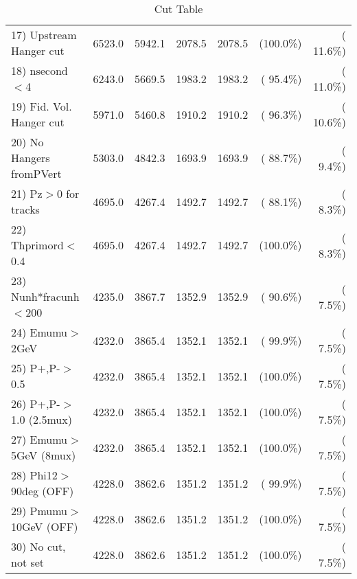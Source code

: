 \begin{table}[h!]
\begin{tabular}{||l||r|r|r|r|r|r||}
 17) Upstream Hanger cut  &       6523.0 &       5942.1 &       2078.5 &       2078.5 & (100.0\%) & ( 11.6\%) \\
 18) nsecond$<$4          &       6243.0 &       5669.5 &       1983.2 &       1983.2 & ( 95.4\%) & ( 11.0\%) \\
 19) Fid. Vol. Hanger cut &       5971.0 &       5460.8 &       1910.2 &       1910.2 & ( 96.3\%) & ( 10.6\%) \\
 20) No Hangers fromPVert &       5303.0 &       4842.3 &       1693.9 &       1693.9 & ( 88.7\%) & (  9.4\%) \\
 21) Pz$>$0 for tracks    &       4695.0 &       4267.4 &       1492.7 &       1492.7 & ( 88.1\%) & (  8.3\%) \\
 22) Thprimord$<$0.4      &       4695.0 &       4267.4 &       1492.7 &       1492.7 & (100.0\%) & (  8.3\%) \\
 23) Nunh*fracunh$<$200   &       4235.0 &       3867.7 &       1352.9 &       1352.9 & ( 90.6\%) & (  7.5\%) \\
 24) Emumu$>$2GeV         &       4232.0 &       3865.4 &       1352.1 &       1352.1 & ( 99.9\%) & (  7.5\%) \\
 25) P+,P-$>$0.5          &       4232.0 &       3865.4 &       1352.1 &       1352.1 & (100.0\%) & (  7.5\%) \\
 26) P+,P-$>$1.0 (2.5mux) &       4232.0 &       3865.4 &       1352.1 &       1352.1 & (100.0\%) & (  7.5\%) \\
 27) Emumu$>$5GeV  (8mux) &       4232.0 &       3865.4 &       1352.1 &       1352.1 & (100.0\%) & (  7.5\%) \\
 28) Phi12$>$90deg  (OFF) &       4228.0 &       3862.6 &       1351.2 &       1351.2 & ( 99.9\%) & (  7.5\%) \\
 29) Pmumu$>$10GeV  (OFF) &       4228.0 &       3862.6 &       1351.2 &       1351.2 & (100.0\%) & (  7.5\%) \\
 30) No cut, not set      &       4228.0 &       3862.6 &       1351.2 &       1351.2 & (100.0\%) & (  7.5\%) \\
 \hline
 \hline
 \end{tabular}
 \caption{Cut Table           }
 \label{tab-cutcohjpsi-mumu_ccdis}
 \end{table}
